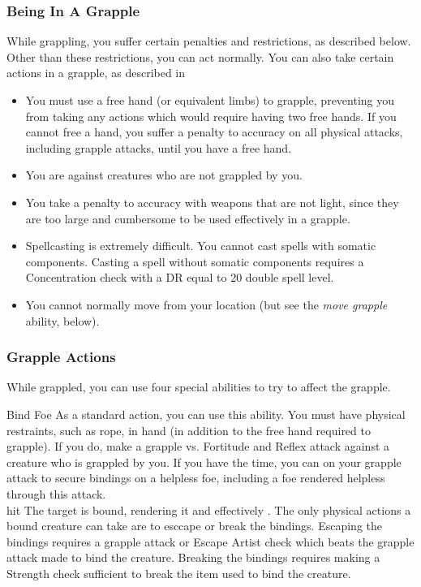         \subsubsection{Being In A Grapple}
            While grappling, you suffer certain penalties and restrictions, as described below. Other than these restrictions, you can act normally. You can also take certain actions in a grapple, as described in 
            \begin{itemize}
                \item You must use a free hand (or equivalent limbs) to grapple, preventing you from taking any actions which would require having two free hands.
                    If you cannot free a hand, you suffer a  penalty to accuracy on all physical attacks, including grapple attacks, until you have a free hand.
                \item You are  against creatures who are not grappled by you.
                \item You take a  penalty to accuracy with weapons that are not light, since they are too large and cumbersome to be used effectively in a grapple.
                \item Spellcasting is extremely difficult. You cannot cast spells with somatic components.
                    Casting a spell without somatic components requires a Concentration check with a DR equal to 20 \add double spell level.
                \item You cannot normally move from your location (but see the \textit{move grapple} ability, below).
            \end{itemize}

        \subsubsection{Grapple Actions}\label{Grapple Actions}
            While grappled, you can use four special abilities to try to affect the grapple.

            \begin{ability}{Bind Foe}
                As a standard action, you can use this ability.
                You must have physical restraints, such as rope, in hand (in addition to the free hand required to grapple).
                If you do, make a grapple vs. Fortitude and Reflex attack against a creature who is grappled by you.
                If you have the time, you can  on your grapple attack to secure bindings on a helpless foe, including a foe rendered helpless through this attack.
                \\hit The target is bound, rendering it  and effectively .
                The only physical actions a bound creature can take are to esccape or break the bindings.
                Escaping the bindings requires a grapple attack or Escape Artist check which beats the grapple attack made to bind the creature.
                Breaking the bindings requires making a Strength check sufficient to break the item used to bind the creature.
            \end{ability}

